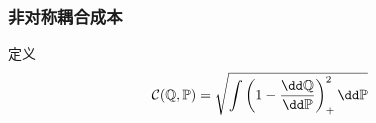 \subsubsection{非对称耦合成本}

定义
\begin{align*}
	\cC(\mathbb{Q}, \mathbb{P})
	= \sqrt{\int\left(1 - \frac{\dd \mathbb{Q}}{\dd \mathbb{P}} \right)_+^2 \dd \mathbb{P}}
\end{align*}




















